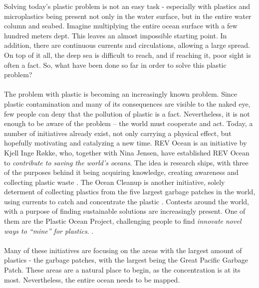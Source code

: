 \noindent
Solving today’s plastic problem is not an easy task - especially with plastics and microplastics being present not only in the water surface, but in the entire water column and seabed. Imagine multiplying the entire ocean surface with a few hundred meters dept. This leaves an almost impossible starting point. In addition, there are continuous currents and circulations, allowing a large spread. On top of it all, the deep sea is difficult to reach, and if reaching it, poor sight is often a fact. So, what have been done so far in order to solve this plastic problem?
\\\\
The problem with plastic is becoming an increasingly known problem. Since plastic contamination and many of its consequences are visible to the naked eye, few people can deny that the pollution of plastic is a fact. Nevertheless, it is not enough to be aware of the problem – the world must cooperate and act. Today, a number of initiatives already exist, not only carrying a physical effect, but hopefully motivating and catalyzing a new time. REV Ocean is an initiative by Kjell Inge R{\o}kke, who, together with Nina Jensen, have established REV Ocean to \textit{contribute to saving the world’s oceans}. The idea is research ships, with three of the purposes behind it being acquiring knowledge, creating awareness and collecting plastic waste . The Ocean Cleanup is another initiative, solely determent of collecting plastics from the five largest garbage patches in the world, using currents to catch and concentrate the plastic . Contests around the world, with a purpose of finding sustainable solutions are increasingly present. One of them are the Plastic Ocean Project, challenging people to find \textit{innovate novel ways to “mine” for plastics}. .
\\\\
Many of these initiatives are focusing on the areas with the largest amount of plastics - the garbage patches, with the largest being the Great Pacific Garbage Patch.   These areas are a natural place to begin, as the concentration is at its most. Nevertheless, the entire ocean needs to be mapped. %
\\\\
